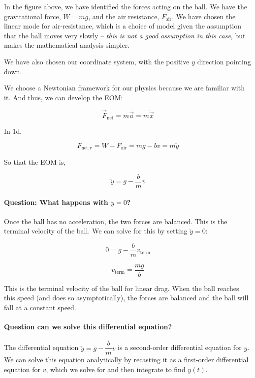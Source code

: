 \documentclass[11pt]{article}
\begin{document}
In the figure above, we have identified the forces acting on the ball.
We have the gravitational force, \(W = mg\), and the air resistance,
\(F_{\text{air}}\). We have chosen the linear mode for air-resistance,
which is a choice of model given the assumption that the ball moves very
slowly -- \emph{this is not a good assumption in this case}, but makes
the mathematical analysis simpler.

We have also chosen our coordinate system, with the positive \(y\)
direction pointing down.

We choose a Newtonian framework for our physics because we are familiar
with it. And thus, we can develop the EOM:

\[\vec{F}_{\text{net}} = m \vec{a} = m\ddot{\vec{x}}\]

In 1d,

\[F_{\text{net,y}} = W - F_{\text{air}} = mg - bv = m \ddot{y}\]

So that the EOM is,

\[\ddot{y} = g - \dfrac{b}{m}v\]

\paragraph{\texorpdfstring{Question: What happens with
\(\ddot{y} = 0\)?}{Question: What happens with \textbackslash ddot\{y\} = 0?}}\label{question-what-happens-with-ddoty-0}

Once the ball has no acceleration, the two forces are balanced. This is
the terminal velocity of the ball. We can solve for this by setting
\(\ddot{y} = 0\):

\[0 = g - \dfrac{b}{m}v_{\text{term}}\]

\[v_{\text{term}} = \dfrac{mg}{b}\]

This is the terminal velocity of the ball for linear drag. When the ball
reaches this speed (and does so asymptotically), the forces are balanced
and the ball will fall at a constant speed.

\paragraph{Question can we solve this differential
equation?}\label{question-can-we-solve-this-differential-equation}

The differential equation \(\ddot{y} = g - \dfrac{b}{m}v\) is a
second-order differential equation for \(y\). We can solve this equation
analytically by recasting it as a first-order differential equation for
\(v\), which we solve for and then integrate to find \(y(t)\).
\end{document}
